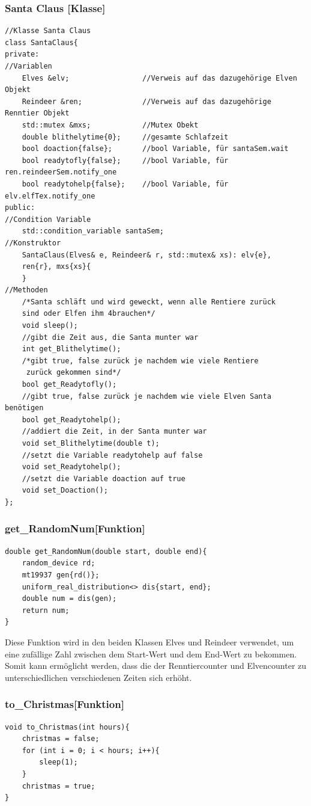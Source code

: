 \documentclass[a4paper,12pt]{article}
\begin{document}
\subsubsection{Santa Claus [Klasse]}
\begin{verbatim}
//Klasse Santa Claus
class SantaClaus{
private:
//Variablen
    Elves &elv;                 //Verweis auf das dazugehörige Elven Objekt
    Reindeer &ren;              //Verweis auf das dazugehörige Renntier Objekt
    std::mutex &mxs;            //Mutex Obekt
    double blithelytime{0};     //gesamte Schlafzeit
    bool doaction{false};       //bool Variable, für santaSem.wait
    bool readytofly{false};     //bool Variable, für ren.reindeerSem.notify_one       
    bool readytohelp{false};    //bool Variable, für elv.elfTex.notify_one
public:
//Condition Variable
    std::condition_variable santaSem;
//Konstruktor
    SantaClaus(Elves& e, Reindeer& r, std::mutex& xs): elv{e},
    ren{r}, mxs{xs}{
    }
//Methoden
    /*Santa schläft und wird geweckt, wenn alle Rentiere zurück 
    sind oder Elfen ihm 4brauchen*/
    void sleep();      
    //gibt die Zeit aus, die Santa munter war         
    int get_Blithelytime(); 
    /*gibt true, false zurück je nachdem wie viele Rentiere
     zurück gekommen sind*/
    bool get_Readytofly(); 
    //gibt true, false zurück je nachdem wie viele Elven Santa benötigen
    bool get_Readytohelp();
    //addiert die Zeit, in der Santa munter war
    void set_Blithelytime(double t);
    //setzt die Variable readytohelp auf false
    void set_Readytohelp();
    //setzt die Variable doaction auf true
    void set_Doaction();
};
\end{verbatim}
\subsubsection{get\_RandomNum[Funktion]}
\begin{verbatim}
double get_RandomNum(double start, double end){
    random_device rd;
    mt19937 gen{rd()};
    uniform_real_distribution<> dis{start, end};
    double num = dis(gen);
    return num;
}
\end{verbatim}
Diese Funktion wird in den beiden Klassen Elves und Reindeer verwendet, um eine zufällige Zahl zwischen dem
Start-Wert und dem End-Wert zu bekommen. Somit kann ermöglicht werden, dass die der Renntiercounter und Elvencounter zu unterschiedlichen
verschiedenen Zeiten sich erhöht. 
\\
\subsubsection{to\_Christmas[Funktion]}
\begin{verbatim}
void to_Christmas(int hours){
    christmas = false;
    for (int i = 0; i < hours; i++){
        sleep(1);
    }
    christmas = true;
}
\end{verbatim}
\end{document}
